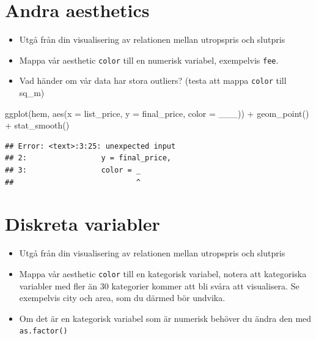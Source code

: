\documentclass[
]{book}
\newenvironment{Shaded}{\begin{snugshade}}{\end{snugshade}}
\newcommand{\AttributeTok}[1]{\textcolor[rgb]{0.77,0.63,0.00}{#1}}
\newcommand{\FunctionTok}[1]{\textcolor[rgb]{0.00,0.00,0.00}{#1}}
\newcommand{\NormalTok}[1]{#1}
\newcommand{\SpecialCharTok}[1]{\textcolor[rgb]{0.00,0.00,0.00}{#1}}
\providecommand{\tightlist}{%
  \setlength{\itemsep}{0pt}\setlength{\parskip}{0pt}}
\begin{document}
\hypertarget{andra-aesthetics}{%
\section{Andra aesthetics}\label{andra-aesthetics}}

\begin{itemize}
\tightlist
\item
  Utgå från din visualisering av relationen mellan utropspris och slutpris
\item
  Mappa vår aesthetic \texttt{color} till en numerisk variabel, exempelvis \texttt{fee}.
\item
  Vad händer om vår data har stora outliers? (testa att mappa \texttt{color} till sq\_m)
\end{itemize}

\begin{Shaded}
\begin{Highlighting}[]
\FunctionTok{ggplot}\NormalTok{(hem, }\FunctionTok{aes}\NormalTok{(}\AttributeTok{x =}\NormalTok{ list\_price, }
                \AttributeTok{y =}\NormalTok{ final\_price,}
                \AttributeTok{color =}\NormalTok{ \_\_\_)) }\SpecialCharTok{+}
  \FunctionTok{geom\_point}\NormalTok{() }\SpecialCharTok{+}
  \FunctionTok{stat\_smooth}\NormalTok{()}
\end{Highlighting}
\end{Shaded}

\begin{verbatim}
## Error: <text>:3:25: unexpected input
## 2:                 y = final_price,
## 3:                 color = _
##                            ^
\end{verbatim}

\hypertarget{diskreta-variabler}{%
\section{Diskreta variabler}\label{diskreta-variabler}}

\begin{itemize}
\tightlist
\item
  Utgå från din visualisering av relationen mellan utropspris och slutpris
\item
  Mappa vår aesthetic \texttt{color} till en kategorisk variabel, notera att kategoriska variabler med fler än 30 kategorier kommer att bli svåra att visualisera. Se exempelvis city och area, som du därmed bör undvika.
\item
  Om det är en kategorisk variabel som är numerisk behöver du ändra den med \texttt{as.factor()}
\end{itemize}
\end{document}
